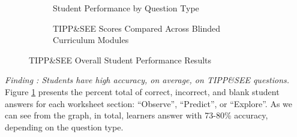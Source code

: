 \documentclass[sigconf,manuscript,review,anonymous]{acmart} %
\def\ts{TIPP\&SEE}
\newcommand{\Scratchencore}[0]{Blinded Curriculum}
\begin{document}
\begin{figure}
     \centering
    \begin{subfigure}[t]{0.49\textwidth}
        \caption{Student Performance by Question Type}
        \label{fig:observe_predict_explore}
    \end{subfigure}
        \hfill
        \begin{subfigure}[t]{0.49\textwidth}
    \label{fig:curriculum_factors}
        \caption{\ts{} Scores Compared Across \Scratchencore{} Modules}
        \label{fig:permodule}
    \end{subfigure}
    \caption{\ts{} Overall Student Performance Results}
    
\end{figure}

\textit{Finding : Students have high accuracy, on average, on \ts{} questions.}
Figure \ref{fig:observe_predict_explore} presents the percent total of correct, incorrect, and blank student answers for each worksheet section: ``Observe'', ``Predict'', or ``Explore''. As we can see from the graph, in total, learners answer with 73-80\% accuracy, depending on the question type.
\end{document}
